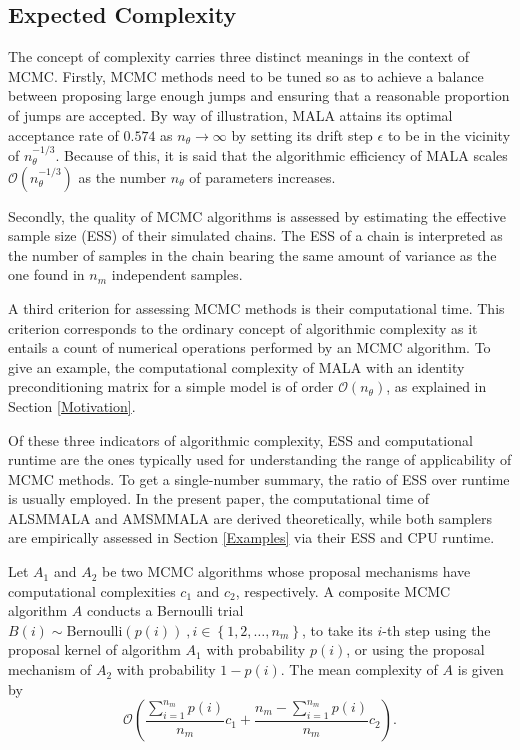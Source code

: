 \documentclass[twoside,11pt]{article}
\begin{document}
\subsection{Expected Complexity}
\label{Expected Complexity}

The concept of complexity carries three distinct meanings in the context of MCMC. Firstly, MCMC methods need to be tuned so
as to achieve a balance between proposing large enough jumps and ensuring that a reasonable proportion of jumps are accepted.
By way of illustration, MALA attains its optimal acceptance rate of $0.574$ as $n_{\theta}\rightarrow\infty$ by setting its
drift step $\epsilon$ to be in the vicinity of $n_{\theta}^{-1/3}$. Because of this, it is said that the algorithmic
efficiency of MALA scales $\mathcal{O}(n_{\theta}^{-1/3})$ as the number $n_{\theta}$ of parameters increases.

Secondly, the quality of MCMC algorithms is assessed by estimating the effective sample size (ESS) of their simulated chains.
The ESS of a chain is interpreted as the number of samples in the chain bearing the same amount of variance as the one found 
in $n_m$ independent samples.

A third criterion for assessing MCMC methods is their computational time.
This criterion corresponds to the ordinary concept of algorithmic complexity as it entails a count of numerical operations
performed by an MCMC algorithm. To give an example, the computational complexity of MALA with an identity preconditioning
matrix for a simple model is of order $\mathcal{O}(n_{\theta})$, as explained in Section \ref{Motivation}.

Of these three indicators of algorithmic complexity, ESS and computational runtime are the ones typically used for
understanding the range of applicability of MCMC methods. To get a single-number summary, the ratio of ESS over runtime is
usually employed. In the present paper, the computational time of ALSMMALA and AMSMMALA are derived theoretically, while 
both samplers are empirically assessed in Section \ref{Examples} via their ESS and CPU runtime.

\begin{proposition}
Let $A_1$ and $A_2$ be two MCMC algorithms whose proposal mechanisms have computational complexities $c_1$ and $c_2$, 
respectively. A composite MCMC algorithm $A$ conducts a Bernoulli trial
$B(i)\sim\mbox{Bernoulli}(p(i))~,i\in\left\{1,2,\dots,n_m\right\}$, to take its $i$-th step using the proposal kernel of 
algorithm $A_1$ with probability $p(i)$, or using the proposal mechanism of $A_2$ with probability $1-p(i)$. The mean 
complexity of $A$ is given by
\begin{equation}
\label{eq:c}
\mathcal{O}\left(
\dfrac{\sum_{i=1}^{n_m}p(i)}{n_m}c_1+\dfrac{n_m-\sum_{i=1}^{n_m}p(i)}{n_m}c_2
\right).
\end{equation}
\end{proposition}
\end{document}
